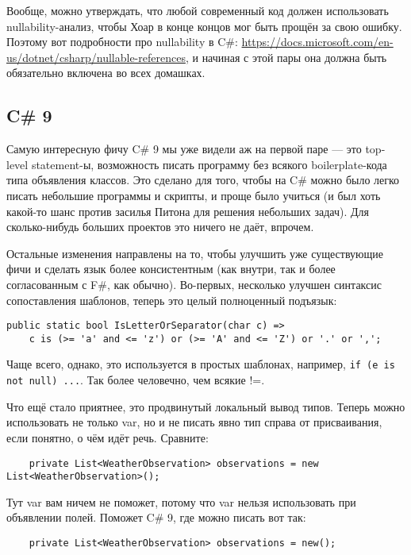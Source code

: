 \documentclass{../../text-style}
\begin{document}
Вообще, можно утверждать, что любой современный код должен использовать nullability-анализ, чтобы Хоар в конце концов мог быть прощён за свою ошибку. Поэтому вот подробности про nullability в C\#: \url{https://docs.microsoft.com/en-us/dotnet/csharp/nullable-references}, и начиная с этой пары она должна быть обязательно включена во всех домашках.

\subsection{C\# 9}

Самую интересную фичу C\# 9 мы уже видели аж на первой паре --- это top-level statement-ы, возможность писать программу без всякого boilerplate-кода типа объявления классов. Это сделано для того, чтобы на C\# можно было легко писать небольшие программы и скрипты, и проще было учиться (и был хоть какой-то шанс против засилья Питона для решения небольших задач). Для сколько-нибудь больших проектов это ничего не даёт, впрочем.

Остальные изменения направлены на то, чтобы улучшить уже существующие фичи и сделать язык более консистентным (как внутри, так и более согласованным с F\#, как обычно). Во-первых, несколько улучшен синтаксис сопоставления шаблонов, теперь это целый полноценный подъязык:

\begin{verbatim}
public static bool IsLetterOrSeparator(char c) =>
    c is (>= 'a' and <= 'z') or (>= 'A' and <= 'Z') or '.' or ',';
\end{verbatim}

Чаще всего, однако, это используется в простых шаблонах, например, \texttt{if (e is not null) ...}. Так более человечно, чем всякие !=.

Что ещё стало приятнее, это продвинутый локальный вывод типов. Теперь можно использовать не только var, но и не писать явно тип справа от присваивания, если понятно, о чём идёт речь. Сравните:

\begin{verbatim}
    private List<WeatherObservation> observations = new List<WeatherObservation>();
\end{verbatim}

Тут var вам ничем не поможет, потому что var нельзя использовать при объявлении полей. Поможет C\# 9, где можно писать вот так:

\begin{verbatim}
    private List<WeatherObservation> observations = new();
\end{verbatim}
\end{document}
